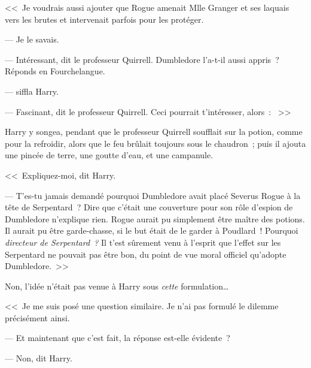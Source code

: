 <<~Je voudrais aussi ajouter que Rogue amenait Mlle Granger et ses laquais vers les brutes et intervenait parfois pour les protéger.

--- Je le savais.

--- Intéressant, dit le professeur Quirrell. Dumbledore l'a-t-il aussi appris~? Réponds en Fourchelangue.

---  siffla Harry.

--- Fascinant, dit le professeur Quirrell. Ceci pourrait t'intéresser, alors~: ~>>

Harry y songea, pendant que le professeur Quirrell soufflait sur la potion, comme pour la refroidir, alors que le feu brûlait toujours sous le chaudron~; puis il ajouta une pincée de terre, une goutte d'eau, et une campanule.

<<~Expliquez-moi, dit Harry.

--- T'es-tu jamais demandé pourquoi Dumbledore avait placé Severus Rogue à la tête de Serpentard~? Dire que c'était une couverture pour son rôle d'espion de Dumbledore n'explique rien. Rogue aurait pu simplement être maître des potions. Il aurait pu être garde-chasse, si le but était de le garder à Poudlard~! Pourquoi \emph{directeur de Serpentard~?} Il t'est sûrement venu à l'esprit que l'effet sur les Serpentard ne pouvait pas être bon, du point de vue moral officiel qu'adopte Dumbledore.~>>

Non, l'idée n'était pas venue à Harry sous \emph{cette} formulation…

<<~Je me suis posé une question similaire. Je n'ai pas formulé le dilemme précisément ainsi.

--- Et maintenant que c'est fait, la réponse est-elle évidente~?

--- Non, dit Harry.

